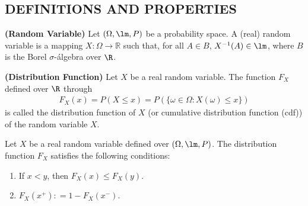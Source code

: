 \subsection{DEFINITIONS AND PROPERTIES}
\begin{definition}{\bf (Random Variable)}
   Let $(\Omega, \lm, P)$ be a probability space. A (real) random variable is a mapping $X\colon \Omega \to \mathbb{R}$
   such that, for all $A\in B$, $X^{-1}(A)\in \lm$, where $B$ is the Borel $\sigma$-\'algebra over $\R$.
\end{definition}

\begin{definition}{\bf (Distribution Function)}
   Let $X$ be a real random variable. The function $F_{X}$ defined over $\R$ through
   \begin{align}
      F_{X}(x) = P(X\leq x) = P(\{\omega\in \Omega\colon X(\omega)\leq x\})
   \end{align}
   is called the distribution function of $X$ (or cumulative distribution function (cdf)) of the random variable $X$.
\end{definition}


\begin{theorem}
   Let $X$ be a real random variable defined over $(\Omega, \lm, P)$. The distribution function 
   $F_{X}$ satisfies the following conditions: 
   \begin{enumerate}[{\rm i.}]
      \item If $x<y$, then $F_{X}(x)\leq F_{X}(y)$.
      \item $F_{X}(x^{+}) \colon = 1 - F_{X}(x^{-})$.
   \end{enumerate}
\end{theorem}